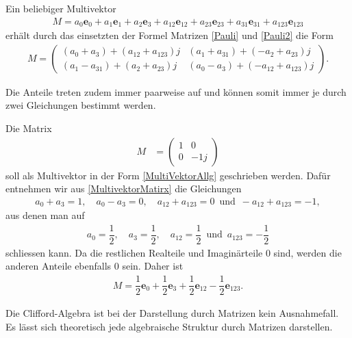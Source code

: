 \begin{hilfssatz}
	Ein beliebiger Multivektor
	\begin{align} \label{MultiVektorAllg}
	M = a_0\mathbf{e}_0 + a_1\mathbf{e}_1 + a_2\mathbf{e}_3 + a_{12}\mathbf{e}_{12} + a_{23}\mathbf{e}_{23} + a_{31}\mathbf{e}_{31} + a_{123}\mathbf{e}_{123}
	\end{align}
	erhält durch das einsetzten der Formel Matrizen \eqref{Pauli} und \eqref{Pauli2} die Form
	\begin{align}
	M =
	\begin{pmatrix}
	(a_0+a_3) + (a_{12}+a_{123})j & (a_1+a_{31})+(-a_2+a_{23})j \\
	(a_1-a_{31})+(a_2+a_{23})j & (a_0-a_3)+(-a_{12}+a_{123})j
	\end{pmatrix}.\label{MultivektorMatirx}
	\end{align}
\end{hilfssatz}
Die Anteile treten zudem immer paarweise auf und können somit immer je durch zwei Gleichungen bestimmt werden.
\begin{beispiel}
	Die Matrix
	\begin{align}
	M &= 
	\begin{pmatrix}
	1 & 0 \\
	0 & -1j
	\end{pmatrix}
	\end{align}
	soll als Multivektor in der Form \eqref{MultiVektorAllg} geschrieben werden. Dafür entnehmen wir aus \eqref{MultivektorMatirx} die Gleichungen
	\begin{align}
	a_0 + a_3 = 1,\quad a_0 - a_3 = 0,\quad a_{12}+a_{123} = 0\enspace\text{und}\enspace -a_{12}+a_{123}=-1,
	\end{align}
	aus denen man auf
	\begin{align}
	a_0 = \dfrac{1}{2},\quad a_3 = \dfrac{1}{2},\quad a_{12}=\dfrac{1}{2}\enspace\text{und}\enspace a_{123}=-\dfrac{1}{2}
	\end{align}
	schliessen kann. Da die restlichen Realteile und Imaginärteile 0 sind, werden die anderen Anteile ebenfalls 0 sein. Daher ist
	\begin{align}
	M = \dfrac{1}{2} \mathbf{e}_0+ \dfrac{1}{2} \mathbf{e}_3 + \dfrac{1}{2} \mathbf{e}_{12} - \dfrac{1}{2} \mathbf{e}_{123}.
	\end{align}
\end{beispiel}
Die Clifford-Algebra ist bei der Darstellung durch Matrizen kein Ausnahmefall. Es lässt sich theoretisch jede algebraische Struktur durch Matrizen darstellen.